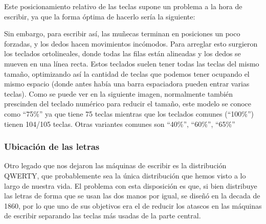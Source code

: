   Este posicionamiento relativo de las teclas supone un problema a la hora de escribir, ya que la forma óptima de hacerlo sería la siguiente:
  
  Sin embargo, para escribir así, las muñecas terminan en posiciones un poco forzadas, y los dedos hacen movimientos incómodos. Para arreglar esto surgieron los teclados ortolineales, donde todas las filas están alineadas y los dedos se mueven en una línea recta. Estos teclados suelen tener todas las teclas del mismo tamaño, optimizando así la cantidad de teclas que podemos tener ocupando el mismo espacio (donde antes había una barra espaciadora pueden entrar varias teclas). Como se puede ver en la siguiente imagen, normalmente también prescinden del teclado numérico para reducir el tamaño, este modelo se conoce como ``75\%'' ya que tiene 75 teclas mientras que los teclados comunes (``100\%'') tienen 104/105 teclas. Otras variantes comunes son ``40\%'', ``60\%'', ``65\%'' 

  \subsubsection{Ubicación de las letras}
  Otro legado que nos dejaron las máquinas de escribir es la distribución QWERTY, que probablemente sea la única distribución que hemos visto a lo largo de nuestra vida. El problema con esta disposición es que, si bien distribuye las letras de forma que se usan las dos manos por igual, se diseñó en la decada de 1860, por lo que uno de sus objetivos era el de reducir los atascos en las máquinas de escribir separando las teclas más usadas de la parte central. 


